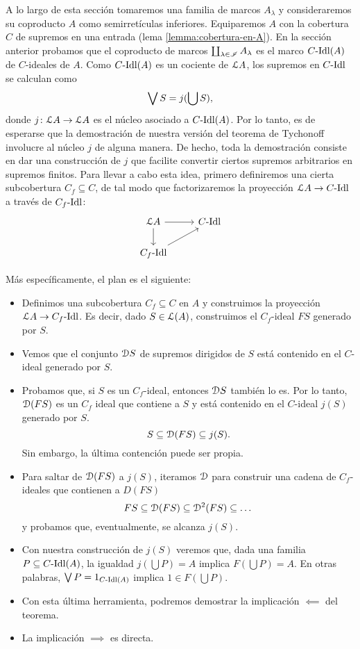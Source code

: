 A lo largo de esta sección tomaremos una familia de marcos
$A_\lambda$ y consideraremos su coproducto $A$ como semirretículas
inferiores. Equiparemos $A$ con la cobertura $C$ de supremos en una
entrada (lema \ref{lemma:cobertura-en-A}).
En la sección anterior probamos que el coproducto de marcos
$\coprod_{\lambda\in\scr I}A_\lambda$ es el marco $C\Idl(A)$ de
$C$-ideales de $A$.
Como $C\Idl(A)$ es un cociente de $\cal LA$,
los supremos en $C\Idl$ se calculan como
\[
    \Sup S = j(\bigcup S)
,\]
donde $j\colon\cal LA\to\cal LA$ es el núcleo asociado a $C\Idl(A)$.
Por lo tanto, es de esperarse que la demostración de
nuestra versión del teorema de Tychonoff involucre al núcleo
$j$ de alguna manera.
De hecho, toda la demostración consiste
en dar una construcción de $j$ que facilite convertir
ciertos supremos arbitrarios en supremos finitos.
Para llevar a cabo esta idea, primero definiremos una
cierta subcobertura $C_f\subseteq C$, de tal modo que
factorizaremos la proyección $\cal LA\to C\Idl$ a través de
$C_f\Idl$:
\[
    \begin{tikzcd}
        \cal LA \ar[d] \ar[r] & C\Idl \\
        C_f\Idl \ar[ur]
    \end{tikzcd}
\]

Más específicamente, el plan es el siguiente:
\begin{itemize}
    \item
    Definimos una subcobertura $C_f\subseteq C$ en $A$ y
    construimos la proyección $\cal LA\to C_f\Idl$.
    Es decir, dado $S\in\cal L(A)$,
    construimos el $C_f$-ideal $FS$ generado por $S$.
    \item 
    Vemos que el conjunto $\cal DS$ de supremos dirigidos
    de $S$ está contenido en el $C$-ideal generado por $S$.
    \item
    Probamos que, si $S$ es un $C_f$-ideal, entonces
    $\cal DS$ también lo es.
    Por lo tanto, $\cal D(FS)$ es un $C_f$ ideal que
    contiene a $S$ y está contenido en el $C$-ideal $j(S)$
    generado por $S$.
    \[
        S\subseteq \cal D(FS) \subseteq j(S)
    .\]
    Sin embargo, la última contención puede ser propia.
    \item
    Para saltar de $\cal D(FS)$ a $j(S)$,
    iteramos $\cal D$ para construir una
    cadena de $C_f$-ideales que contienen a $D(FS)$
    \[
        FS\subseteq \cal D(FS) \subseteq \cal D^2(FS)
        \subseteq \dots
    \]
    y probamos que, eventualmente, se alcanza $j(S)$.
    \item
    Con nuestra construcción de $j(S)$ veremos
    que, dada una familia $P\subseteq C\Idl(A)$,
    la igualdad
    $j(\bigcup P)=A$ implica $F(\bigcup P)=A$.
    En otras palabras,
    $\Sup P = 1_{C\Idl(A)}$ implica $1\in F(\bigcup P)$.
    \item
    Con esta última herramienta, podremos demostrar
    la implicación $\impliedby$ del teorema.
    \item
    La implicación $\implies$ es directa.
\end{itemize}

